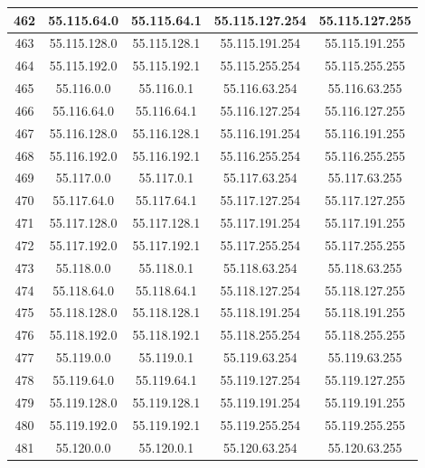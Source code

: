\documentclass[letterpaper,12pt]{article}
\begin{document}
\begin{center}
\begin{longtable}{|c|c|c|c|c|}
                462 & 55.115.64.0 & 55.115.64.1 & 55.115.127.254 & 55.115.127.255 \\ \hline
                463 & 55.115.128.0 & 55.115.128.1 & 55.115.191.254 & 55.115.191.255 \\ \hline
                464 & 55.115.192.0 & 55.115.192.1 & 55.115.255.254 & 55.115.255.255 \\ \hline
                465 & 55.116.0.0 & 55.116.0.1 & 55.116.63.254 & 55.116.63.255 \\ \hline
                466 & 55.116.64.0 & 55.116.64.1 & 55.116.127.254 & 55.116.127.255 \\ \hline
                467 & 55.116.128.0 & 55.116.128.1 & 55.116.191.254 & 55.116.191.255 \\ \hline
                468 & 55.116.192.0 & 55.116.192.1 & 55.116.255.254 & 55.116.255.255 \\ \hline
                469 & 55.117.0.0 & 55.117.0.1 & 55.117.63.254 & 55.117.63.255 \\ \hline
                470 & 55.117.64.0 & 55.117.64.1 & 55.117.127.254 & 55.117.127.255 \\ \hline
                471 & 55.117.128.0 & 55.117.128.1 & 55.117.191.254 & 55.117.191.255 \\ \hline
                472 & 55.117.192.0 & 55.117.192.1 & 55.117.255.254 & 55.117.255.255 \\ \hline
                473 & 55.118.0.0 & 55.118.0.1 & 55.118.63.254 & 55.118.63.255 \\ \hline
                474 & 55.118.64.0 & 55.118.64.1 & 55.118.127.254 & 55.118.127.255 \\ \hline
                475 & 55.118.128.0 & 55.118.128.1 & 55.118.191.254 & 55.118.191.255 \\ \hline
                476 & 55.118.192.0 & 55.118.192.1 & 55.118.255.254 & 55.118.255.255 \\ \hline
                477 & 55.119.0.0 & 55.119.0.1 & 55.119.63.254 & 55.119.63.255 \\ \hline
                478 & 55.119.64.0 & 55.119.64.1 & 55.119.127.254 & 55.119.127.255 \\ \hline
                479 & 55.119.128.0 & 55.119.128.1 & 55.119.191.254 & 55.119.191.255 \\ \hline
                480 & 55.119.192.0 & 55.119.192.1 & 55.119.255.254 & 55.119.255.255 \\ \hline
                481 & 55.120.0.0 & 55.120.0.1 & 55.120.63.254 & 55.120.63.255 \\ \hline

\end{longtable}
\end{center}
\end{document}
